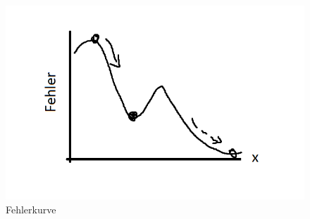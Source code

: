 \begin{figure}[H]
    \centering
    \includegraphics[scale=1]{pics/fehler.png}
    \caption{Fehlerkurve}
    \label{fig:tech:Fehler}
\end{figure}

